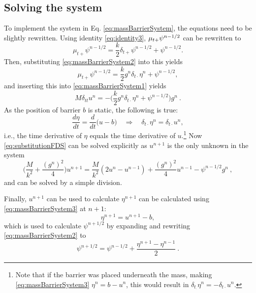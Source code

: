 \subsection{Solving the system}\label{sec:solvingMassBarrier}
To implement the system in Eq. \eqref{eq:massBarrierSystem}, the equations need to be slightly rewritten. Using identity \eqref{eq:identity3}, $\mu_{t+} \psi^{n-1/2}$ can be rewritten to
\begin{equation*}
    \mu_{t+}\psi^{n-1/2} = \frac{k}{2}\delta_{t+}\psi^{n-1/2} + \psi^{n-1/2}.
\end{equation*}
Then, substituting \eqref{eq:massBarrierSystem2} into this yields
\begin{equation}\nonumber
    \mu_{t+}\psi^{n-1/2} = \frac{k}{2}g^n\delta_{t\cdot}\eta^n + \psi^{n-1/2},
\end{equation}
and inserting this into \eqref{eq:massBarrierSystem1} yields
\begin{equation}\label{eq:substitutionFDS}
    M\delta_{tt}u^n = -\Big(\frac{k}{2}g^n\delta_{t\cdot}\eta^n + \psi^{n-1/2}\Big)g^n\ .
\end{equation}
As the position of barrier $b$ is static, the following is true:
\begin{equation}\label{eq:derEtaEqDerU}
    \frac{d\eta}{dt} = \frac{d}{dt}\Big(u - b\Big)\quad \Longrightarrow \quad \delta_{t\cdot}\eta^n = \delta_{t\cdot}u^n,
\end{equation}
i.e., the time derivative of $\eta$ equals the time derivative of $u$.\footnote{Note that if the barrier was placed underneath the mass, making \eqref{eq:massBarrierSystem3} $\eta^n = b-u^n$, this would result in $\delta_{t_\cdot}\eta^n = -\delta_{t\cdot}u^n$.} Now \eqref{eq:substitutionFDS} can be solved explicitly as $u^{n+1}$ is the only unknown in the system
\begin{equation}
    \bigg(\frac{M}{k^2} + \frac{(g^n)^2}{4}\bigg)u^{n+1} = \frac{M}{k^2}(2u^n-u^{n-1})+\frac{(g^n)^2}{4}u^{n-1}-\psi^{n-1/2}g^n\ ,
\end{equation}
and can be solved by a simple division. 

Finally, $u^{n+1}$ can be used to calculate $\eta^{n+1}$ can be calculated using \eqref{eq:massBarrierSystem3} at $n+1$:
\begin{equation}\label{eq:etaNPlus1}
    \eta^{n+1} = u^{n+1}-b,
\end{equation}
which is used to calculate $\psi^{n+1/2}$ by expanding and rewriting \eqref{eq:massBarrierSystem2} to
\begin{equation}\label{eq:psiNPlusHalf}
    \psi^{n+1/2} = \psi^{n-1/2} + \frac{\eta^{n+1} - \eta^{n-1}}{2}\ .
\end{equation}

